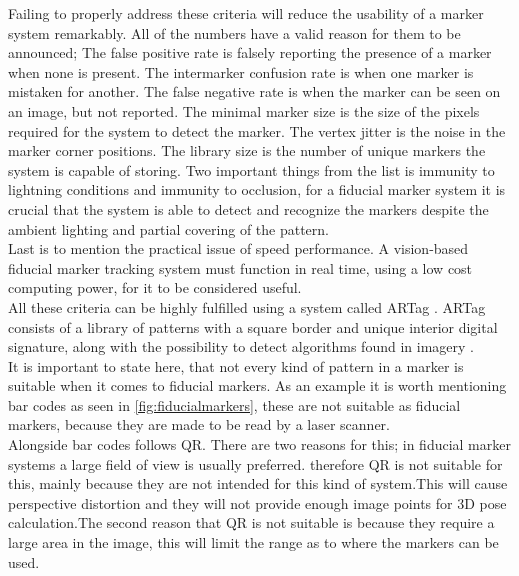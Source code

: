 				Failing to properly address these criteria will reduce the usability of a marker system remarkably\cite{fiducialMarkers}. All of the numbers have a valid reason for them to be announced; The false positive rate is falsely reporting the presence of a marker when none is present. The intermarker confusion rate is when one marker is mistaken for another. The false negative rate is when the marker can be seen on an image, but not reported. The minimal marker size is the size of the pixels required for the system to detect the marker. The vertex jitter is the noise in the marker corner positions. The library size is the number of unique markers the system is capable of storing. Two important things from the list is immunity to lightning conditions and immunity to occlusion, for a fiducial marker system it is crucial that the system is able to detect and recognize the markers despite the ambient lighting and partial covering of the pattern.\\
				Last is to mention the practical issue of speed performance. A vision-based fiducial marker tracking system must function in real time, using a low cost computing power, for it to be considered useful.\\
				
				All these criteria can be highly fulfilled using a system called ARTag \cite{fiducialARTag}. ARTag consists of a library of patterns with a square border and unique interior digital signature, along with the possibility to detect algorithms found in imagery \cite{fiducialMarkers}.\\
				
				It is important to state here, that not every kind of pattern in a marker is suitable when it comes to fiducial markers\cite{fiducialMarkers}. As an example it is worth mentioning bar codes as seen in \autoref{fig:fiducialmarkers}, these are not suitable as fiducial markers, because they are made to be read by a laser scanner.\\
				Alongside bar codes follows QR. There are two reasons for this; in fiducial marker systems a large field of view is usually preferred. therefore QR is not suitable for this, mainly because they are not intended for this kind of system.This will cause perspective distortion and they will not provide enough image points for 3D pose calculation.The second reason that QR is not suitable is because they require a large area in the image, this will limit the range as to where the markers can be used.\\ 
				
